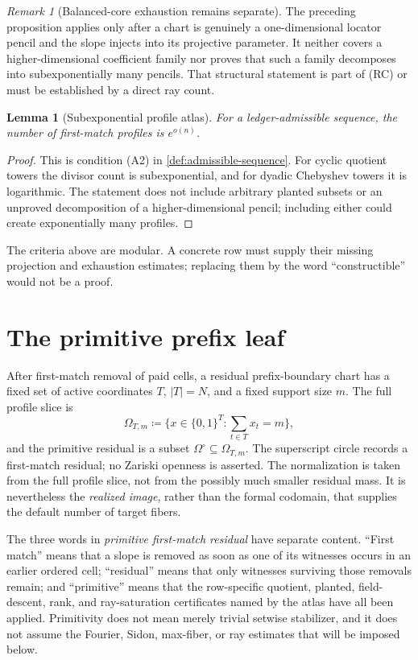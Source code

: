 \documentclass[12pt,a4paper]{amsart}
\numberwithin{equation}{section}
\newtheorem{lemma}[lemma]{Lemma}
\theoremstyle{remark}
\newtheorem{remark}[remark]{Remark}
\newcommand{\Omc}{\Omega^{\circ}}
\newcommand{\abs}[1]{\lvert #1\rvert}
\newcommand{\defeq}{\coloneqq}
\begin{document}
\begin{remark}[Balanced-core exhaustion remains separate]
\label{rem:balanced-core-exhaustion}
The preceding proposition applies only after a chart is genuinely a
one-dimensional locator pencil and the slope injects into its projective
parameter.  It neither covers a higher-dimensional coefficient family nor
proves that such a family decomposes into subexponentially many pencils.
That structural statement is part of \textup{(RC)} or must be established
by a direct ray count.
\end{remark}

\begin{lemma}[Subexponential profile atlas]\label{lem:profile-atlas}
For a ledger-admissible sequence, the number of first-match profiles is
\(e^{o(n)}\).
\end{lemma}

\begin{proof}
This is condition (A2) in \cref{def:admissible-sequence}.  For cyclic
quotient towers the divisor count is subexponential, and for dyadic
Chebyshev towers it is logarithmic.  The statement does not include
arbitrary planted subsets or an unproved decomposition of a
higher-dimensional pencil; including either could create exponentially many
profiles.
\end{proof}

The criteria above are modular.  A concrete row must supply their missing
projection and exhaustion estimates; replacing them by the word
``constructible'' would not be a proof.
\section{The primitive prefix leaf}\label{sec:primitive-leaf}

After first-match removal of paid cells, a residual prefix-boundary chart
has a fixed set of active coordinates \(T\), \(\abs T=N\), and a fixed
support size \(m\).  The full profile slice is
\[
        \Omega_{T,m}\defeq\{x\in\{0,1\}^{T}:\sum_{t\in T}x_t=m\},
\]
and the primitive residual is a subset \(\Omc\subseteq\Omega_{T,m}\).
The superscript circle records a first-match residual; no Zariski openness
is asserted.  The normalization is taken from the full profile slice, not
from the possibly much smaller residual mass.  It is nevertheless the
\emph{realized image}, rather than the formal codomain, that supplies the
default number of target fibers.

The three words in \emph{primitive first-match residual} have separate
content.  ``First match'' means that a slope is removed as soon as one of
its witnesses occurs in an earlier ordered cell; ``residual'' means that
only witnesses surviving those removals remain; and ``primitive'' means
that the row-specific quotient, planted, field-descent, rank, and ray-saturation
certificates named by the atlas have all been applied.  Primitivity does
not mean merely trivial setwise stabilizer, and it does not assume the
Fourier, Sidon, max-fiber, or ray estimates that will be imposed below.
\end{document}
